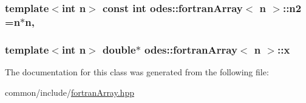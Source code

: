 \subsubsection[{n2}]{\setlength{\rightskip}{0pt plus 5cm}template$<$int n$>$ const int {\bf odes\+::fortran\+Array}$<$ n $>$\+::n2 =n$\ast$n\hspace{0.3cm}{\ttfamily [static]}, {\ttfamily [private]}}\label{classodes_1_1fortranArray_a730a0a23dd09551539653ee6fd2c973d}
\hypertarget{classodes_1_1fortranArray_a71fc035c3f3ff899674122533b6713c1}{}
\subsubsection[{x}]{\setlength{\rightskip}{0pt plus 5cm}template$<$int n$>$ double$\ast$ {\bf odes\+::fortran\+Array}$<$ n $>$\+::x\hspace{0.3cm}{\ttfamily [private]}}\label{classodes_1_1fortranArray_a71fc035c3f3ff899674122533b6713c1}


The documentation for this class was generated from the following file\+:\begin{DoxyCompactItemize}
\item 
common/include/\hyperlink{fortranArray_8hpp}{fortran\+Array.\+hpp}\end{DoxyCompactItemize}
